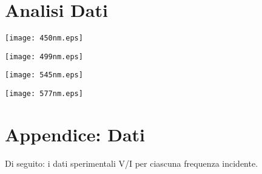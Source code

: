\documentclass[10pt,a4paper]{article}
\begin{document}
\section*{Analisi Dati}
\begin{minipage}{.6\linewidth}
		\centering
		\texttt{[image: 450nm.eps]}
		\label{fig:circuito-1}
	\end{minipage}
	\begin{minipage}{.4\linewidth}
		
		\label{tab:124}
\end{minipage}\newline\newline
\begin{minipage}{.6\linewidth}
		\centering
		\texttt{[image: 499nm.eps]}
		\label{fig:circuito-1}
	\end{minipage}
	\begin{minipage}{.4\linewidth}
		
		\label{tab:124}
\end{minipage}\newline\newline
\begin{minipage}{.6\linewidth}
		\centering
		\texttt{[image: 545nm.eps]}
		\label{fig:circuito-1}
	\end{minipage}
	\begin{minipage}{.4\linewidth}
		
		\label{tab:124}
\end{minipage}\newline\newline
\newline
\begin{minipage}{.6\linewidth}
		\centering
		\texttt{[image: 577nm.eps]}
		\label{fig:circuito-1}
	\end{minipage}
	\begin{minipage}{.4\linewidth}
		
		\label{tab:124}
\end{minipage}\newline\newline
\newline
\section*{Appendice: Dati}
\noindent
Di seguito: i dati sperimentali V/I per ciascuna frequenza incidente.\\
\end{document}
